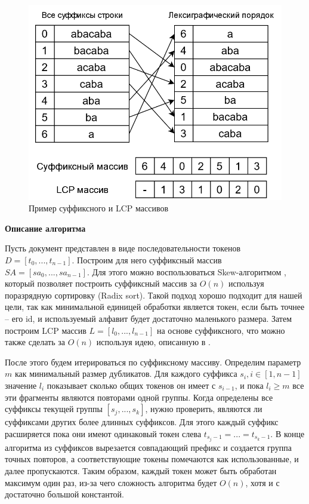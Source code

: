 \documentclass[14pt]{matmex-diploma-custom}
\begin{document}
\begin{figure}[h!]
	\includegraphics[scale=0.45]{pictures/SA-LCP.png}
	\centering
	\caption{Пример суффиксного и LCP массивов}
	\label{fig:SA_LCP}
\end{figure}

\textbf{Описание алгоритма}

Пусть документ представлен в виде последовательности токенов $D = [t_0,...,t_{n-1}]$. Построим для него суффиксный массив $SA = [sa_0,...,sa_{n-1}]$. Для этого можно воспользоваться Skew-алгоритмом \cite{bib:art:SkewAlg}, который позволяет построить суффиксный массив за $O(n)$ используя поразрядную сортировку (Radix sort). Такой подход хорошо подходит для нашей цели, так как минимальной единицей обработки является токен, если быть точнее -- его id, и используемый алфавит будет достаточно маленького размера. Затем построим LCP массив $L = [l_0,...,l_{n-1}]$ на основе суффиксного, что можно также сделать за $O(n)$ используя идею, описанную в \cite{bib:art:LCPArray}.

После этого будем итерироваться по суффиксному массиву. Определим параметр $m$ как минимальный размер дубликатов. Для каждого суффикса $s_i, i \in [1,n-1]$ значение $l_i$ показывает сколько общих токенов он имеет с $s_{i-1}$, и пока $l_i \ge m$ все эти фрагменты являются повторами одной группы. Когда определены все суффиксы текущей группы $[s_j,...,s_k]$, нужно проверить, являются ли суффиксами других более длинных суффиксов. Для этого каждый суффикс расширяется пока они имеют одинаковый токен слева $t_{s_j - 1} = ... = t_{s_k - 1}$. В конце алгоритма из суффиксов вырезается совпадающий префикс и создается группа точных повторов, а соответствующие токены помечаются как использованные, и далее пропускаются. Таким образом, каждый токен может быть обработан максимум один раз, из-за чего сложность алгоритма будет $O(n)$, хотя и с достаточно большой константой.
\end{document}
